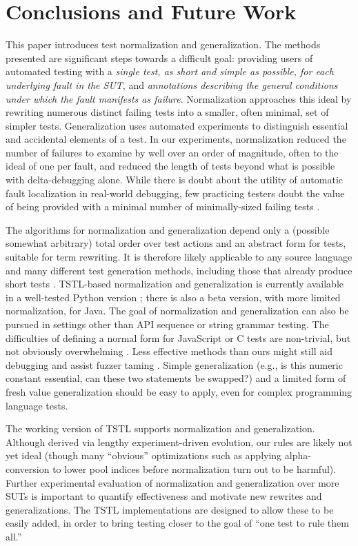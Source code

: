 \section{Conclusions and Future Work}

This paper introduces test normalization and generalization.  The
methods presented are significant steps towards a difficult goal:
providing users of automated testing with a \emph{single test, as
  short and simple as possible, for each underlying fault in the SUT},
and \emph{annotations describing the general conditions under which
  the fault manifests as failure}.  Normalization approaches this
ideal by rewriting numerous distinct failing tests into a smaller,
often minimal, set of simpler tests.  Generalization uses automated
experiments to distinguish essential and accidental elements of a
test.  In our experiments, normalization reduced the number of
failures to examine by well over an order of magnitude, often to the
ideal of one per fault, and reduced the length of tests beyond what is
possible with delta-debugging alone.  While there is doubt about the
utility of automatic fault localization \cite{AutoHelp} in real-world debugging, few practicing testers
doubt the value of being provided with a minimal number of
minimally-sized failing tests \cite{MinUnit,lithium,AMAI}.

The algorithms for normalization and
generalization depend only a (possible somewhat arbitrary) total order
over test actions and an abstract form for tests, suitable for term
rewriting.  It is therefore likely applicable to any source language
and many different test generation methods, including those that
already produce short tests \cite{FA11,SoftBET}.  TSTL-based
normalization and generalization is currently available in a
well-tested Python version \cite{tstl,ISSTA15}; there is also a beta version, with more limited
normalization, for Java.
The goal of normalization and generalization can also be pursued in
settings other than API sequence or string grammar testing.  The
difficulties of defining a normal form for JavaScript \cite{jsfunfuzz}
or C \cite{csmith} tests are non-trivial, but not obviously
overwhelming \cite{CReduce}. Less effective methods
than ours might still aid debugging and assist fuzzer taming
\cite{PLDI13}.  Simple generalization (e.g., is this numeric constant
essential, can these two statements be swapped?) and a limited form of
fresh value generalization should be easy to apply, even for complex
programming language tests.  

The working version of  TSTL \cite{tstl} supports
normalization and generalization.  Although derived via lengthy experiment-driven
evolution, our rules are likely not yet ideal (though many ``obvious''
optimizations such as applying alpha-conversion to lower pool indices
before normalization turn out to be harmful).   Further experimental
evaluation of normalization and generalization over more SUTs is
important to quantify effectiveness and motivate new rewrites and
generalizations.  The TSTL implementations are designed to allow these
to be easily added, in order to bring testing closer to the
goal of ``one test to rule them all.''
